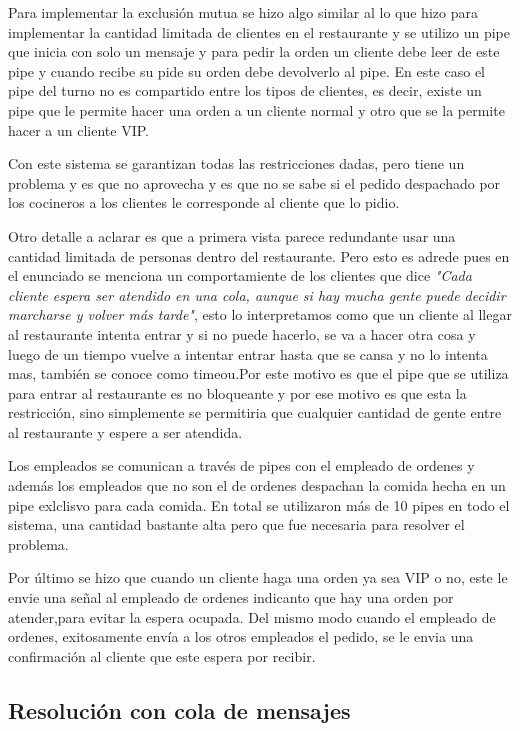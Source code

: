 \documentclass[11pt]{article} %
\begin{document}
    Para implementar la exclusión mutua se hizo algo similar al lo que hizo para implementar la cantidad limitada de clientes en el restaurante y se utilizo un pipe que inicia con solo un mensaje y para pedir la orden un cliente debe leer de este pipe y cuando recibe su pide su orden debe devolverlo al pipe. En este caso el pipe del turno no es compartido entre los tipos de clientes, es decir, existe un pipe que le permite hacer una orden a un cliente normal y otro que se la permite hacer a un cliente VIP.

    Con este sistema se garantizan todas las restricciones dadas, pero tiene un problema y es que no aprovecha y es que no se sabe si el pedido despachado por los cocineros a los clientes le corresponde al cliente que lo pidio.

    Otro detalle a aclarar es que a primera vista parece redundante usar una cantidad limitada de personas dentro del restaurante. Pero esto es adrede pues en el enunciado se menciona un comportamiente de los clientes que dice \textit{"Cada cliente espera ser atendido en una cola, aunque si hay mucha gente puede decidir marcharse y volver más tarde"}, esto lo interpretamos como que un cliente al llegar al restaurante intenta entrar y si no puede hacerlo, se va a hacer otra cosa y luego de un tiempo vuelve a intentar entrar hasta que se cansa y no lo intenta mas, también se conoce como timeou.Por este motivo es que el pipe que se utiliza para entrar al restaurante es no bloqueante y por ese motivo es que esta la restricción, sino simplemente se permitiria que cualquier cantidad de gente entre al restaurante y espere a ser atendida.

    Los empleados se comunican a través de pipes con el empleado de ordenes y además los empleados que no son el de ordenes despachan la comida hecha en un pipe exlclisvo para cada comida. En total se utilizaron más de 10 pipes en todo el sistema, una cantidad bastante alta pero que fue necesaria para resolver el problema.

    Por último se hizo que cuando un cliente haga una orden ya sea VIP o no, este le envie una señal al empleado de ordenes indicanto que hay una orden por atender,para evitar la espera ocupada. Del mismo modo cuando el empleado de ordenes, exitosamente envía a los otros empleados el pedido, se le envia una confirmación al cliente que este espera por recibir.


\subsection{Resolución con cola de mensajes}
\end{document}
